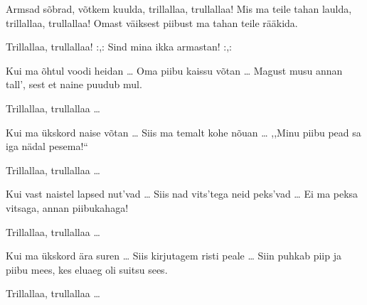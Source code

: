 Armsad s\~obrad, v\~otkem kuulda,
trillallaa, trullallaa!
Mis ma teile tahan laulda, 
trillallaa, trullallaa!
Omast v\"aiksest piibust ma
tahan teile r\"a\"akida.

Trillallaa, trullallaa!
:,: Sind mina ikka armastan! :,: 

Kui ma \~ohtul voodi heidan \ldots
Oma piibu kaissu v\~otan \ldots
Magust musu annan tall',
sest et naine puudub mul.

Trillallaa, trullallaa \ldots

Kui ma \"ukskord naise v\~otan \ldots
Siis ma temalt kohe n\~ouan \ldots
,,Minu piibu pead sa
iga n\"adal pesema!{``}

Trillallaa, trullallaa \ldots

Kui vast naistel lapsed nut'vad \ldots
Siis nad vits'tega neid peks'vad \ldots
Ei ma peksa vitsaga,
annan piibukahaga!

Trillallaa, trullallaa \ldots

Kui ma \"ukskord \"ara suren \ldots
Siis kirjutagem risti peale \ldots
Siin puhkab piip ja piibu mees,
kes eluaeg oli suitsu sees.

Trillallaa, trullallaa \ldots